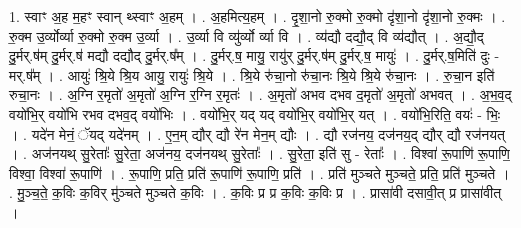 \documentclass[17pt]{extarticle}
\begin{document}
1. स्वाꣳ अ॒ह म॒हꣳ स्वान् थ्स्वाꣳ अ॒हम् । . अ॒हमित्य॒हम् । . दृ॒शा॒नो रु॒क्मो रु॒क्मो दृ॑शा॒नो दृ॑शा॒नो रु॒क्मः । . रु॒क्म उ॒र्व्योर्व्या रु॒क्मो रु॒क्म उ॒र्व्या । . उ॒र्व्या वि व्यु॑र्व्यो र्व्या वि । . व्य॑द्यौ दद्यौ॒द् वि व्य॑द्यौत् । . अ॒द्यौ॒द् दु॒र्मर्.ष॑म् दु॒र्मर्.ष॑ मद्यौ दद्यौद् दु॒र्मर्.ष᳚म् । . दु॒र्मर्.ष॒ मायु॒ रायु॑र् दु॒र्मर्.ष॑म् दु॒र्मर्.ष॒ मायुः॑ । . दु॒र्मर्.ष॒मिति॑ दुः - मर्.ष᳚म् । . आयुः॑ श्रि॒ये श्रि॒य आयु॒ रायुः॑ श्रि॒ये । . श्रि॒ये रु॑चा॒नो रु॑चा॒नः श्रि॒ये श्रि॒ये रु॑चा॒नः । . रु॒चा॒न इति॑ रुचा॒नः । . अ॒ग्नि र॒मृतो॑ अ॒मृतो॑ अ॒ग्नि र॒ग्नि र॒मृतः॑ । . अ॒मृतो॑ अभव दभव द॒मृतो॑ अ॒मृतो॑ अभवत् । . अ॒भ॒व॒द् वयो॑भि॒र् वयो॑भि रभव दभव॒द् वयो॑भिः । . वयो॑भि॒र् यद् यद् वयो॑भि॒र् वयो॑भि॒र् यत् । . वयो॑भि॒रिति॒ वयः॑ - भिः॒ । . यदे॑न मेनं॒ ॅयद् यदे॑नम् । . ए॒न॒म् द्यौर् द्यौ रे॑न मेन॒म् द्यौः । . द्यौ रज॑नय॒ दज॑नय॒द् द्यौर् द्यौ रज॑नयत् । . अज॑नयथ् सु॒रेताः᳚ सु॒रेता॒ अज॑नय॒ दज॑नयथ् सु॒रेताः᳚ । . सु॒रेता॒ इति॑ सु - रेताः᳚ । . विश्वा॑ रू॒पाणि॑ रू॒पाणि॒ विश्वा॒ विश्वा॑ रू॒पाणि॑ । . रू॒पाणि॒ प्रति॒ प्रति॑ रू॒पाणि॑ रू॒पाणि॒ प्रति॑ । . प्रति॑ मुञ्चते मुञ्चते॒ प्रति॒ प्रति॑ मुञ्चते । . मु॒ञ्च॒ते॒ क॒विः क॒विर् मु॑ञ्चते मुञ्चते क॒विः । . क॒विः प्र प्र क॒विः क॒विः प्र । . प्रासा॑वी दसावी॒त् प्र प्रासा॑वीत् । \newline
\end{document}
